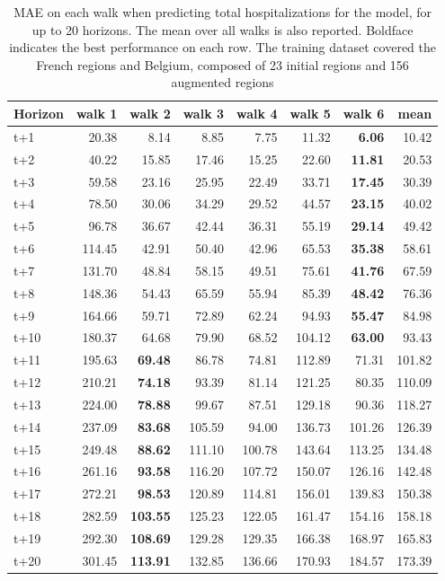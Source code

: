 \begin{table}[H]
\centering
\caption{MAE on each walk when predicting total hospitalizations for the model, for up to 20 horizons. The mean over all walks is also reported. Boldface indicates the best performance on each row. The training dataset covered the French regions and Belgium, composed of 23 initial regions and 156 augmented regions }
\label{tab:MAE_walk_baseline}
\begin{tabular}{lrrrrrrr}
\toprule
Horizon &  walk 1 &  walk 2 &  walk 3 &  walk 4 &  walk 5 &  walk 6 &   mean \\
\midrule
t+1  & 20.38  & 8.14  & 8.85  & 7.75  & 11.32  & \textbf{6.06}  & 10.42  \\
t+2  & 40.22  & 15.85  & 17.46  & 15.25  & 22.60  & \textbf{11.81}  & 20.53  \\
t+3  & 59.58  & 23.16  & 25.95  & 22.49  & 33.71  & \textbf{17.45}  & 30.39  \\
t+4  & 78.50  & 30.06  & 34.29  & 29.52  & 44.57  & \textbf{23.15}  & 40.02  \\
t+5  & 96.78  & 36.67  & 42.44  & 36.31  & 55.19  & \textbf{29.14}  & 49.42  \\
t+6  & 114.45  & 42.91  & 50.40  & 42.96  & 65.53  & \textbf{35.38}  & 58.61  \\
t+7  & 131.70  & 48.84  & 58.15  & 49.51  & 75.61  & \textbf{41.76}  & 67.59  \\
t+8  & 148.36  & 54.43  & 65.59  & 55.94  & 85.39  & \textbf{48.42}  & 76.36  \\
t+9  & 164.66  & 59.71  & 72.89  & 62.24  & 94.93  & \textbf{55.47}  & 84.98  \\
t+10  & 180.37  & 64.68  & 79.90  & 68.52  & 104.12  & \textbf{63.00}  & 93.43  \\
t+11  & 195.63  & \textbf{69.48}  & 86.78  & 74.81  & 112.89  & 71.31  & 101.82  \\
t+12  & 210.21  & \textbf{74.18}  & 93.39  & 81.14  & 121.25  & 80.35  & 110.09  \\
t+13  & 224.00  & \textbf{78.88}  & 99.67  & 87.51  & 129.18  & 90.36  & 118.27  \\
t+14  & 237.09  & \textbf{83.68}  & 105.59  & 94.00  & 136.73  & 101.26  & 126.39  \\
t+15  & 249.48  & \textbf{88.62}  & 111.10  & 100.78  & 143.64  & 113.25  & 134.48  \\
t+16  & 261.16  & \textbf{93.58}  & 116.20  & 107.72  & 150.07  & 126.16  & 142.48  \\
t+17  & 272.21  & \textbf{98.53}  & 120.89  & 114.81  & 156.01  & 139.83  & 150.38  \\
t+18  & 282.59  & \textbf{103.55}  & 125.23  & 122.05  & 161.47  & 154.16  & 158.18  \\
t+19  & 292.30  & \textbf{108.69}  & 129.28  & 129.35  & 166.38  & 168.97  & 165.83  \\
t+20  & 301.45  & \textbf{113.91}  & 132.85  & 136.66  & 170.93  & 184.57  & 173.39  \\

\bottomrule
\end{tabular}
\end{table}
